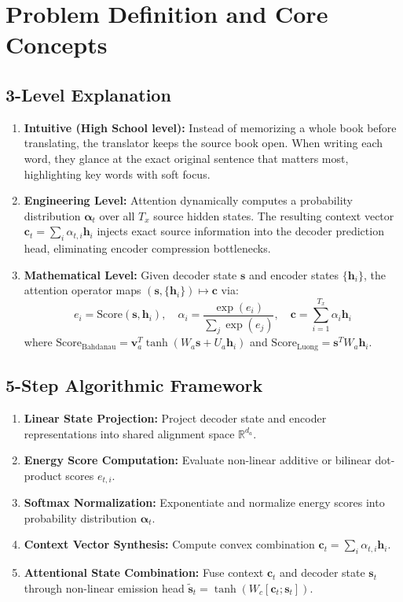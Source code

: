 \documentclass[11pt,a4paper]{article}
\theoremstyle{definition}
\begin{document}
\section{Problem Definition and Core Concepts}

\subsection{3-Level Explanation}
\begin{enumerate}
    \item \textbf{Intuitive (High School level):} Instead of memorizing a whole book before translating, the translator keeps the source book open. When writing each word, they glance at the exact original sentence that matters most, highlighting key words with soft focus.
    \item \textbf{Engineering Level:} Attention dynamically computes a probability distribution $\boldsymbol{\alpha}_t$ over all $T_x$ source hidden states. The resulting context vector $\mathbf{c}_t = \sum_i \alpha_{t, i} \mathbf{h}_i$ injects exact source information into the decoder prediction head, eliminating encoder compression bottlenecks.
    \item \textbf{Mathematical Level:} Given decoder state $\mathbf{s}$ and encoder states $\{\mathbf{h}_i\}$, the attention operator maps $(\mathbf{s}, \{\mathbf{h}_i\}) \mapsto \mathbf{c}$ via:
    \begin{equation}
    e_i = \text{Score}(\mathbf{s}, \mathbf{h}_i), \quad \alpha_i = \frac{\exp(e_i)}{\sum_j \exp(e_j)}, \quad \mathbf{c} = \sum_{i=1}^{T_x} \alpha_i \mathbf{h}_i
    \end{equation}
    where $\text{Score}_{\text{Bahdanau}} = \mathbf{v}_a^T \tanh(W_a \mathbf{s} + U_a \mathbf{h}_i)$ and $\text{Score}_{\text{Luong}} = \mathbf{s}^T W_a \mathbf{h}_i$.
\end{enumerate}

\subsection{5-Step Algorithmic Framework}
\begin{enumerate}
    \item \textbf{Linear State Projection:} Project decoder state and encoder representations into shared alignment space $\mathbb{R}^{d_a}$.
    \item \textbf{Energy Score Computation:} Evaluate non-linear additive or bilinear dot-product scores $e_{t, i}$.
    \item \textbf{Softmax Normalization:} Exponentiate and normalize energy scores into probability distribution $\boldsymbol{\alpha}_t$.
    \item \textbf{Context Vector Synthesis:} Compute convex combination $\mathbf{c}_t = \sum_i \alpha_{t, i} \mathbf{h}_i$.
    \item \textbf{Attentional State Combination:} Fuse context $\mathbf{c}_t$ and decoder state $\mathbf{s}_t$ through non-linear emission head $\tilde{\mathbf{s}}_t = \tanh(W_c [\mathbf{c}_t; \mathbf{s}_t])$.
\end{enumerate}
\end{document}
